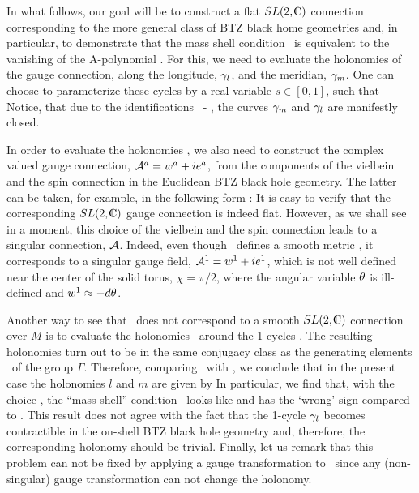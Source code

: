 In what follows, our goal will be to construct a flat
$SL(2,\IC)$ connection corresponding to the more general
class of BTZ black home geometries
and, in particular, to demonstrate that the mass shell
condition \btzonshell\ is equivalent to the vanishing
of the A-polynomial \lminusone.
For this, we need to evaluate the holonomies
of the gauge connection,
%
\eqn{}
%
along the longitude, $\gamma_l$, and the meridian, $\gamma_m$.
One can choose to parameterize these cycles by a real
variable $s \in [0,1]$, such that
%
\eqn{}
%
Notice, that due to the identifications \btzident\ - \btzprimeident,
the curves $\gamma_m$ and $\gamma_l$ are manifestly closed.

In order to evaluate the holonomies \holfla, we also need to
construct the complex valued gauge connection,
${\cal A}^a = w^a + i e^a$, from the components of the vielbein and
the spin connection in the Euclidean BTZ black hole geometry.
The latter can be taken, for example, in the following
form :
%
\eqn{}
%
It is easy to verify that the corresponding
$SL(2,\IC)$ gauge connection is indeed flat.
However, as we shall see in a moment,
this choice of the vielbein and the spin connection
leads to a singular connection, ${\cal A}$.
Indeed, even though \btzee\ defines a smooth metric \rchimetric,
it corresponds to a singular gauge field, ${\cal A}^1 = w^1 + i e^1$,
which is not well defined near the center of the solid torus,
$\chi = \pi/2$, where the angular variable $\theta$ is
ill-defined and $w^1 \approx - d \theta$.

Another way to see that \btzee\ does not correspond to
a smooth $SL(2,\IC)$ connection over $M$ is to evaluate
the holonomies \holfla\ around the 1-cycles \btzlm.
The resulting holonomies turn out to be in the same
conjugacy class as the generating elements \btzhol\
of the group $\Gamma$.
Therefore, comparing \btzhol\ with \lmholonomies,
we conclude that in the present case
the holonomies $l$ and $m$ are given by
%
\eqn{}
%
In particular, we find that, with the choice \btzee,
the ``mass shell'' condition \btzonshell\ looks like
%
\eqn{}
%
and has the `wrong' sign compared to \lminusone.
This result does not agree with the fact that
the 1-cycle $\gamma_l$ becomes contractible in the on-shell
BTZ black hole geometry and, therefore,
the corresponding holonomy should be trivial.
Finally, let us remark that this problem can not be
fixed by applying a gauge transformation to \btzee\
since any (non-singular) gauge transformation can not
change the holonomy.

